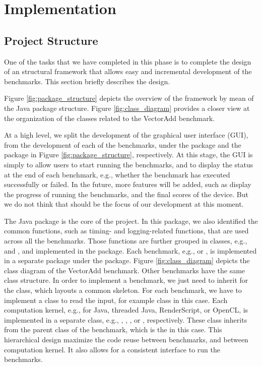 \section*{Implementation}

\subsection*{Project Structure}

One of the tasks that we have completed in this phase is to complete the design
of an structural framework that allows easy and incremental development of the
benchmarks. This section briefly describes the design.

Figure \ref{fig:package_structure} depicts the overview of the framework by mean
of the Java package structure. Figure \ref{fig:class_diagram} provides a closer
view at the organization of the classes related to the VectorAdd benchmark.

At a high level, we split the development of the graphical user interface (GUI),
from the development of each of the benchmarks, under the  package and the
 package in Figure \ref{fig:package_structure}, respectively. At this
stage, the GUI is simply to allow users to start running the benchmarks, and to 
display the status at the end of each benchmark, e.g., whether the benchmark has executed
successfully or failed. In the future, more features will be added, such as
display the progress of running the benchmarks, and the final scores of the
device. But we do not think that should be the focus of our development at this
moment.

The  Java package is the core of the project. In this package, we also
identified the common functions, such as timing- and logging-related functions,
that are used across all the benchmarks. Those functions are further grouped in
classes, e.g.,  and , and implemented in the 
package. Each benchmark, e,g.,  or , is implemented in a
separate package under the  package. Figure
\ref{fig:class_diagram} depicts the class diagram of the VectorAdd benchmark.
Other benchmarks have the same class structure. In order to implement a
benchmark, we just need to inherit for the  class, which
layouts a common skeleton. For each benchmark, we have to implement a class to
read the input, for example  class in this case. Each
computation kernel, e.g., for Java, threaded Java, RenderScript, or OpenCL, is
implemented in a separate class, e.g., ,
, , or ,
respectively. These class inherits from the parent class of the benchmark, which
is the  in this case. This hierarchical design maximize
the code reuse between benchmarks, and between computation kernel.
It also allows for a consistent interface to run the benchmarks.

